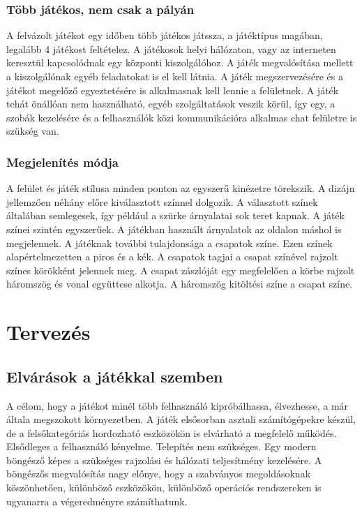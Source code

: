 \documentclass[]{article}
\begin{document}
\subsubsection{Több játékos, nem csak a
pályán}

A felvázolt játékot egy időben több játékos játssza, a játéktípus
magában, legalább 4 játékost feltételez. A játékosok helyi hálózaton,
vagy az interneten keresztül kapcsolódnak egy központi kiszolgálóhoz. A
játék megvalósítása mellett a kiszolgálónak egyéb feladatokat is el kell
látnia. A játék megszervezésére és a játékot megelőző egyeztetésére is
alkalmasnak kell lennie a felületnek. A játék tehát önállóan nem
használható, egyéb szolgáltatások veszik körül, így egy, a szobák
kezelésére és a felhasználók közi kommunikációra alkalmas chat felületre
is szükség van.


\subsubsection{Megjelenítés módja}

A felület és játék stílusa minden ponton az egyszerű kinézetre
törekszik. A dizájn jellemzően néhány előre kiválasztott színnel
dolgozik. A választott színek általában semlegesek, így például a szürke
árnyalatai sok teret kapnak. A játék színei szintén egyszerűek. A
játékban használt árnyalatok az oldalon máshol is megjelennek. A
játéknak további tulajdonsága a csapatok színe. Ezen színek
alapértelmezetten a piros és a kék. A csapatok tagjai a csapat színével
rajzolt színes körökként jelennek meg. A csapat zászlóját egy
megfelelően a körbe rajzolt háromszög és vonal együttese alkotja. A
háromszög kitöltési színe a csapat színe.


\section{Tervezés}


\subsection{Elvárások a játékkal
szemben}

A célom, hogy a játékot minél több felhasználó kipróbálhassa,
élvezhesse, a már általa megszokott környezetben. A játék elsősorban
asztali számítógépekre készül, de a felsőkategóriás hordozható
eszközökön is elvárható a megfelelő működés. Elsődleges a felhasználó
kényelme. Telepítés nem szükséges. Egy modern böngésző képes a szükséges
rajzolási és hálózati teljesítmény kezelésére. A böngészős megvalósítás
nagy előnye, hogy a szabványos megoldásoknak köszönhetően, különböző
eszközökön, különböző operációs rendszereken is ugyanarra a
végeredményre számíthatunk.
\end{document}
